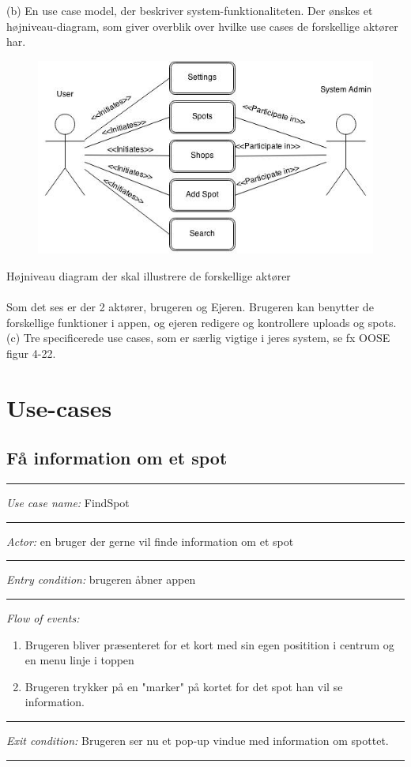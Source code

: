 \documentclass[12pt]{article}
\begin{document}
(b) En use case model, der beskriver system-funktionaliteten. Der ønskes et højniveau-diagram,
som giver overblik over hvilke use cases de forskellige aktører har.\\
\begin{figure}[htb]
\begin{center}
\includegraphics[scale = 0.75]{usecasemodel}
\end{center}
\end{figure}

Højniveau diagram der skal illustrere de forskellige aktører\\\\
Som det ses er der 2 aktører, brugeren og Ejeren. Brugeren kan benytter de forskellige funktioner i appen, og ejeren redigere og kontrollere uploads og spots. 
\pagebreak\\
(c) Tre specificerede use cases, som er særlig vigtige i jeres system, se fx OOSE figur 4-22.\\
\setlength\parindent{0pt}
\section*{Use-cases}
\subsection*{Få information om et spot}
\hrule\vspace{5mm}
\textit{Use case name:} FindSpot\\
\hrule\vspace{5mm}
\textit{Actor:} en bruger der gerne vil finde information om et spot\\
\hrule\vspace{5mm}
\textit{Entry condition:} brugeren åbner appen\\
\hrule\vspace{5mm}
\textit{Flow of events:}
\begin{enumerate}
\item Brugeren bliver præsenteret for et kort med sin egen positition i centrum og en menu linje i toppen
\item Brugeren trykker på en "marker" på kortet for det spot han vil se information.
\end{enumerate}
\hrule\vspace{5mm}
\textit{Exit condition:} Brugeren ser nu et pop-up vindue med information om spottet.\\
\hrule\vspace{5mm}
\newpage
\end{document}
